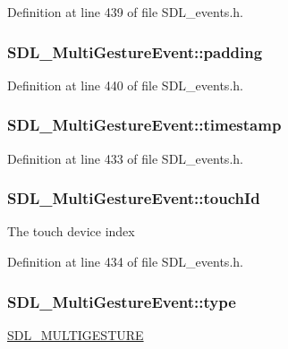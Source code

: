 Definition at line 439 of file S\-D\-L\-\_\-events.\-h.

\hypertarget{struct_s_d_l___multi_gesture_event_a4804ec87789e697aba138c4888bb304b}{
\subsubsection[{padding}]{ S\-D\-L\-\_\-\-Multi\-Gesture\-Event\-::padding}}\label{struct_s_d_l___multi_gesture_event_a4804ec87789e697aba138c4888bb304b}


Definition at line 440 of file S\-D\-L\-\_\-events.\-h.

\hypertarget{struct_s_d_l___multi_gesture_event_a7e99a98debf3ce11f6d2a2fbb3637175}{
\subsubsection[{timestamp}]{ S\-D\-L\-\_\-\-Multi\-Gesture\-Event\-::timestamp}}\label{struct_s_d_l___multi_gesture_event_a7e99a98debf3ce11f6d2a2fbb3637175}


Definition at line 433 of file S\-D\-L\-\_\-events.\-h.

\hypertarget{struct_s_d_l___multi_gesture_event_aa15d1201559a3c9277082af71a972dc1}{
\subsubsection[{touch\-Id}]{ S\-D\-L\-\_\-\-Multi\-Gesture\-Event\-::touch\-Id}}\label{struct_s_d_l___multi_gesture_event_aa15d1201559a3c9277082af71a972dc1}
The touch device index 

Definition at line 434 of file S\-D\-L\-\_\-events.\-h.

\hypertarget{struct_s_d_l___multi_gesture_event_ab0c7adc9a3f71cc3532bfe0ff8cc6120}{
\subsubsection[{type}]{ S\-D\-L\-\_\-\-Multi\-Gesture\-Event\-::type}}\label{struct_s_d_l___multi_gesture_event_ab0c7adc9a3f71cc3532bfe0ff8cc6120}
\hyperlink{_s_d_l__events_8h_a3b589e89be6b35c02e0dd34a55f3fccaaa225e29d8bf6e619dda824c81826c929}{S\-D\-L\-\_\-\-M\-U\-L\-T\-I\-G\-E\-S\-T\-U\-R\-E} 


